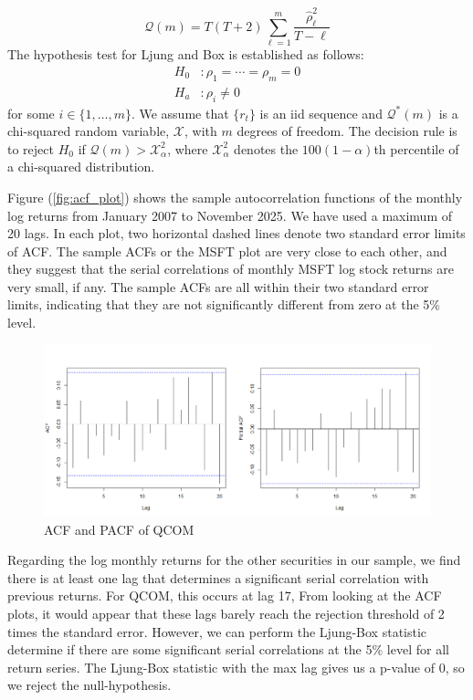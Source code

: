 \begin{equation}
	\mathcal{Q}(m)=T(T+2)\sum_{\ell=1}^{m}\frac{\hat{\rho}_\ell^2}{T-\ell}
\end{equation}
The hypothesis test for Ljung and Box is established as follows:
\[
\begin{aligned}
	H_0&:\rho_1=\cdots=\rho_m=0\\
	H_a&:\rho_i\neq 0
\end{aligned}
\]
for some $i\in\lbrace1,\ldots,m\rbrace$. We assume that $\lbrace r_t\rbrace$ is an iid sequence and $\mathcal{Q}^*(m)$ is a chi-squared random variable, $\mathcal{X}$, with $m$ degrees of freedom. The decision rule is to reject $H_0$ if $\mathcal{Q}(m)>\mathcal{X}^2_\alpha$, where $\mathcal{X}^2_\alpha$ denotes the $100\left(1-\alpha\right)$th percentile of a chi-squared distribution. 

Figure (\ref{fig:acf_plot}) shows the sample autocorrelation functions of the monthly log returns from January 2007 to November 2025. We have used a maximum of 20 lags. In each plot, two horizontal dashed lines denote two standard error limits of ACF. The sample ACFs or the MSFT plot are very close to each other, and they suggest that the serial correlations of monthly MSFT log stock returns are very small, if any. The sample ACFs are all within their two standard error limits, indicating that they are not significantly different from zero at the 5\% level.

\begin{figure}[h]
	\centering
	\includegraphics[width=0.9\linewidth]{content/plots/qcom_acf_pacf.png}
	\caption{ACF and PACF of QCOM}
	\label{fig:qcom_acf_pacf}
\end{figure}

Regarding the log monthly returns for the other securities in our sample, we find there is at least one lag that determines a significant serial correlation with previous returns. For QCOM, this occurs at lag 17, From looking at the ACF plots, it would appear that these lags barely reach the rejection threshold of 2 times the standard error. However, we can perform the Ljung-Box statistic determine if there are some significant serial correlations at the 5\% level for all return series. The Ljung-Box statistic with the max lag gives us a p-value of 0, so we reject the null-hypothesis.


